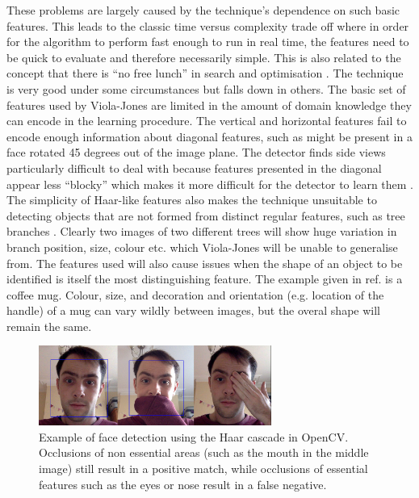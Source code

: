 \documentclass[conference]{IEEEtran}
\begin{document}
These problems are largely caused by the technique's dependence on such basic features. This leads to the classic time versus complexity trade off where in order for the algorithm to perform fast enough to run in real time, the features need to be quick to evaluate and therefore necessarily simple. This is also related to the concept that there is ``no free lunch'' in search and optimisation \cite{wolpert1997no}. The technique is very good under some circumstances but falls down in others. The basic set of features used by Viola-Jones are limited in the amount of domain knowledge they can encode in the learning procedure. The vertical and horizontal features fail to encode enough information about diagonal features, such as might be present in a face rotated 45 degrees out of the image plane. The detector finds side views particularly difficult to deal with because features presented in the diagonal appear less ``blocky'' which makes it more difficult for the detector to learn them \cite{bradski2008learning}. The simplicity of Haar-like features also makes the technique unsuitable to detecting objects that are not formed from distinct regular features, such as tree branches \cite{bradski2008learning}. Clearly two images of two different trees will show huge variation in branch position, size, colour etc. which Viola-Jones will be unable to generalise from. The features used will also cause issues when the shape of an object to be identified is itself the most distinguishing feature. The example given in ref. \cite{bradski2008learning} is a coffee mug. Colour, size, and decoration and orientation (e.g. location of the handle) of a mug can vary wildly between images, but the overal shape will remain the same.

\begin{figure}[!t]
\centering
\includegraphics[width=3in]{img/face_detect_example.jpg}
\caption{Example of face detection using the Haar cascade in OpenCV. Occlusions of non essential areas (such as the mouth in the middle image) still result in a positive match, while occlusions of essential features such as the eyes or nose result in a false negative.}
\label{fig:occlusions}
\end{figure}
\end{document}
